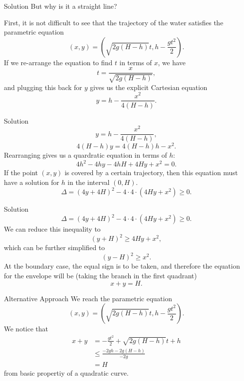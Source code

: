 \documentclass{beamer}
\begin{document}
    \begin{frame}{Solution}
        But why is it a straight line? \pause

        First, it is not difficult to see that the trajectory of the water satisfies the parametric equation
        \[
            (x, y) = \left(\sqrt{2g(H-h)}t, h-\frac{gt^2}{2}\right).
        \]
        \pause
        If we re-arrange the equation to find \(t\) in terms of \(x\), we have
        \[
            t = \frac{x}{\sqrt{2g(H-h)}},
        \]
        and plugging this back for \(y\) gives us the explicit Cartesian equation
        \[
            y = h - \frac{x^2}{4(H-h)}.
        \]
    \end{frame}

    \begin{frame}{Solution}
        \[
            y = h - \frac{x^2}{4(H-h)},
        \]
        \[
            4(H-h)y = 4(H-h)h - x^2.
        \]
        \pause
        Rearranging gives us a quardratic equation in terms of \(h\):
        \[
            4h^2 - 4hy - 4hH + 4Hy + x^2 = 0.
        \]
        \pause
        If the point \((x, y)\) is covered by a certain trajectory, then this equation must have a solution for \(h\) in the interval \((0, H)\).
        \pause
        \[
            \Delta = (4y + 4H)^2 - 4 \cdot 4 \cdot (4Hy + x^2) \geq 0.
        \]
    \end{frame}

    \begin{frame}{Solution}
        \[
            \Delta = (4y + 4H)^2 - 4 \cdot 4 \cdot (4Hy + x^2) \geq 0.
        \]
        \pause
        We can reduce this inequality to
        \[
            (y+H)^2 \geq 4Hy + x^2,
        \]
        which can be further simplified to
        \[
            (y-H)^2 \geq x^2.
        \]
        \pause
        At the boundary case, the equal sign is to be taken, and therefore the equation for the envelope will be (taking the branch in the first quadrant)
        \[
            x + y = H.
        \]
        \pause
        \href{https://www.desmos.com/calculator/srwqthbwfu}{}
    \end{frame}

    \begin{frame}{Alternative Approach}
        We reach the parametric equation
        \[
            (x, y) = \left(\sqrt{2g(H-h)}t, h-\frac{gt^2}{2}\right).
        \]
        \pause
        We notice that
        \begin{align*}
            x + y &= - \frac{gt^2}{2} + \sqrt{2g (H-h)} t + h \\
            & \leq \frac{- 2 gh - 2g (H-h)}{- 2g} \\
            &= H
        \end{align*}
        from basic propertiy of a quadratic curve.
    \end{frame}
\end{document}
